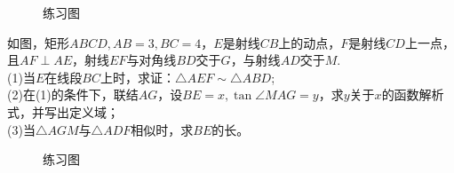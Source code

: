 \begin{figure}[H]
    \centering
    \resizebox{4cm}{!}{}
    \caption{练习图}
\end{figure}
\begin{problem}
如图，矩形$ABCD,AB=3,BC=4$，$E$是射线$CB$上的动点，$F$是射线$CD$上一点，且$AF\perp AE$，射线$EF$与对角线$BD$交于$G$，与射线$AD$交于$M$. \\
(1)当$E$在线段$BC$上时，求证：$\triangle AEF \sim \triangle ABD$; \\
(2)在(1)的条件下，联结$AG$，设$BE=x,\tan \angle MAG=y$，求$y$关于$x$的函数解析式，并写出定义域；\\
(3)当$\triangle AGM $与$\triangle ADF $相似时，求$BE$的长。
\end{problem}
\begin{figure}[H]
    \centering
    \resizebox{8cm}{!}{}
    \caption{练习图}
\end{figure}
\clearpage
